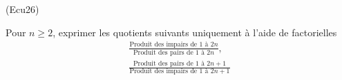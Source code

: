 \begin{tiny}(Ecu26)\end{tiny} Pour $n\geq 2$, exprimer les quotients suivants uniquement à l'aide de factorielles
\begin{multline*}
 \frac{\text{Produit des impairs de $1$ à $2n$}}{\text{Produit des pairs de $1$ à $2n$}}, \\
 \frac{\text{Produit des pairs de $1$ à $2n+1$}}{\text{Produit des impairs de $1$ à $2n+1$}}
\end{multline*}
